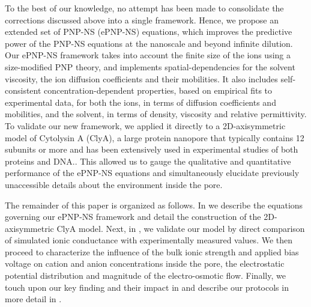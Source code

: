 \documentclass[journal=ancac3,manuscript=article,etalmode=truncate,maxauthors=0,layout=onecolumn]{achemso}
\begin{document}
To the best of our knowledge, no attempt has been made to consolidate the corrections discussed above into a
single framework. Hence, we propose an extended set of PNP-NS (ePNP-NS) equations, which improves the
predictive power of the PNP-NS equations at the nanoscale and beyond infinite dilution. Our ePNP-NS framework
takes into account the finite size of the ions using a size-modified PNP theory,\cite{Lu-2011} and implements
spatial-dependencies for the solvent viscosity,\cite{Pronk-2014,Hsu-2017} the ion diffusion coefficients and
their mobilities.\cite{Makarov-1998,Noskov-2004} It also includes self-consistent concentration-dependent
properties, based on empirical fits to experimental data, for both the ions, in terms of diffusion
coefficients and mobilities,\cite{Baldessari-2008-1,Mills-1989} and the solvent, in terms of density,
viscosity\cite{Hai-Lang-1996} and relative permittivity\cite{Gavish-2016}. To validate our new framework, we
applied it directly to a 2D-axisymmetric model of Cytolysin A (ClyA), a large protein nanopore that typically
contains 12 subunits\cite{Mueller-2009} or more\cite{Soskine-2013} and has been extensively used in
experimental studies of both proteins\cite{Soskine-2013,VanMeervelt-2014,Soskine-Biesemans-2015,
Biesemans-Soskine-2015,Wloka-2017,VanMeervelt-2017,Galenkamp-2018} and DNA.\cite{Franceschini-2013,
Franceschini-2016}. This allowed us to gauge the qualitative and quantitative performance of the ePNP-NS
equations and simultaneously elucidate previously unaccessible details about the environment inside the pore.

The remainder of this paper is organized as follows. In \emph{} we describe the equations
governing our ePNP-NS framework and detail the construction of the 2D-axisymmetric ClyA model. Next, in
\emph{}, we validate our model by direct comparison of simulated ionic conductance with
experimentally measured values. We then proceed to characterize the influence of the bulk ionic strength and
applied bias voltage on cation and anion concentrations inside the pore, the electrostatic potential
distribution and magnitude of the electro-osmotic flow. Finally, we touch upon our key finding and their impact
in \emph{} and describe our protocols in more detail in \emph{}.
\end{document}
